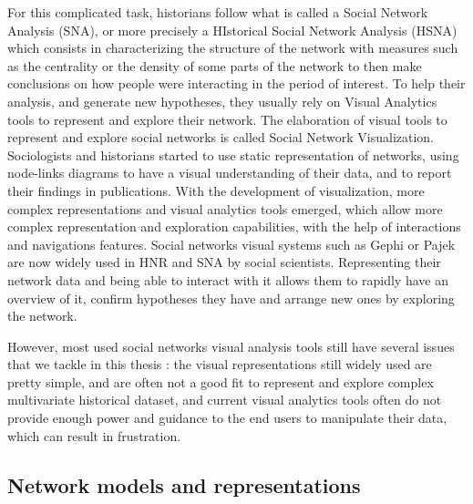 For this complicated task, historians follow what is called a Social Network Analysis (SNA), or more precisely a HIstorical Social Network Analysis (HSNA) which consists in characterizing the structure of the network with measures such as the centrality or the density of some parts of the network to then make conclusions on how people were interacting in the period of interest. To help their analysis, and generate new hypotheses, they usually rely on Visual Analytics tools to represent and explore their network. The elaboration of visual tools to represent and explore social networks is called Social Network Visualization.
Sociologists and historians started to use static representation of networks, using node-links diagrams to have a visual understanding of their data, and to report their findings in publications. With the development of visualization, more complex representations and visual analytics tools emerged, which allow more complex representation and exploration capabilities, with the help of interactions and navigations features. Social networks visual systems such as Gephi or Pajek are now widely used in HNR and SNA by social scientists. Representing their network data and being able to interact with it allows them to rapidly have an overview of it, confirm hypotheses they have and arrange new ones by exploring the network.

However, most used social networks visual analysis tools still have several issues that we tackle in this thesis : the visual representations still widely used are pretty simple, and are often not a good fit to represent and explore complex multivariate historical dataset, and current visual analytics tools often do not provide enough power and guidance to the end users to manipulate their data, which can result in frustration.

\subsection{Network models and representations}

